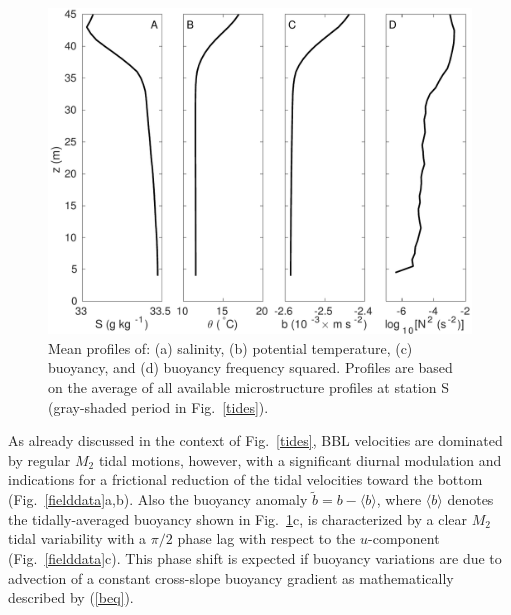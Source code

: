 \begin{figure}
  \noindent\includegraphics[width=30pc]{res_daten.pdf}
  \caption{Mean profiles of: (a) salinity, (b) potential temperature,
    (c) buoyancy, and (d) buoyancy frequency squared. Profiles are based on the 
average of all available microstructure profiles at station S (gray-shaded 
period in Fig.\ \ref{tides}).}
  \label{meanprofiles}
\end{figure}

As already discussed in the context of Fig.\ \ref{tides}, BBL
velocities are dominated by regular $M_2$ tidal motions, however, with
a significant diurnal modulation and indications for a frictional
reduction of the tidal velocities toward the bottom
(Fig.\ \ref{fielddata}a,b). Also the buoyancy anomaly
$\tilde{b}=b-\langle b \rangle$, where $ \langle b \rangle$ denotes
the tidally-averaged buoyancy shown in Fig.\ \ref{meanprofiles}c, is
characterized by a clear $M_2$ tidal variability with a $\pi/2$ phase
lag with respect to the $u$-component (Fig.\ \ref{fielddata}c). This
phase shift is expected if buoyancy variations are due to advection of
a constant cross-slope buoyancy gradient as mathematically described
by (\ref{beq}).

